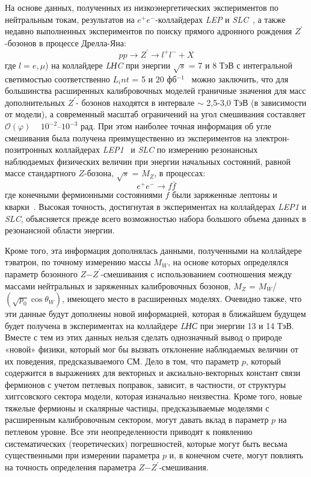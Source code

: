 На основе данных, полученных из низкоэнергетических экспериментов по нейтральным токам, результатов на $e^+e^-$-коллайдерах \textit{LEP} и \textit{SLC}~\cite{Bobovnikov:2016}, а также недавно выполненных экспериментов по поиску прямого адронного рождения $Z^\prime$-бозонов в процессе Дрелла-Яна:
\begin{equation} \label{eq:drell}
	pp \rightarrow Z^\prime \rightarrow l^+l^- + X
\end{equation}
где $l=e,\mu$) на коллайдере \textit{LНC} при энергии $\sqrt{s}$ = 7 и 8 ТэВ с интегральной светимостью соответственно $L_int$ = 5 и 20 фб${}^{-1}$~\cite{Bobovnikov:2016} можно заключить, что для большинства расширенных калибровочных моделей граничные значения для масс дополнительных $Z^\prime$- бозонов находятся в интервале $\sim$ 2,5-3,0 ТэВ (в зависимости от модели), а современный масштаб ограничений на угол смешивания составляет $\mathcal{O}(\varphi )$ ~ ${10}^{-2}$--${10}^{-3}$ рад. При этом наиболее точная информация об угле смешивания была получена преимущественно из экспериментов на электрон-позитронных коллайдерах \textit{LEP1}~\cite{schael:2006} и \textit{SLC} по измерению резонансных наблюдаемых физических величин при энергии начальных состояний, равной массе стандартного $Z$-бозона, $\sqrt{s}$ = $M_Z$, в процессах:
\begin{equation} \label{eq:drell2}
	e^+e^- \rightarrow f\bar{f}
\end{equation}
где конечными фермионными состояниями $f$ были заряженные лептоны и кварки~\cite{andreev-pankov:2012}. Высокая точность, достигнутая в экспериментах на коллайдерах \textit{LEP1} и \textit{SLC}, объясняется прежде всего возможностью набора большого объема данных в резонансной области энергии.

Кроме того, эта информация дополнялась данными, полученными на коллайдере тэватрон, по точному измерению массы $M_W$, на основе которых определялся параметр бозонного $Z$−$Z^\prime$-смешивания с использованием соотношения между массами нейтральных и заряженных калибровочных бозонов, $M_Z$ = $M_W$/$(\sqrt{p_0}\cos\theta_W)$, имеющего место в расширенных моделях. Очевидно также, что эти данные будут дополнены новой информацией, которая в ближайшем будущем будет получена в экспериментах на коллайдере \textit{LНС} при энергии 13 и 14 ТэВ. Вместе с тем из этих данных нельзя сделать однозначный вывод о природе «новой» физики, который мог бы вызвать отклонение наблюдаемых величин от их поведения, предсказываемого СМ. Дело в том, что параметр $p$, который содержится в выражениях для векторных и аксиально-векторных констант связи фермионов с учетом петлевых поправок, зависит, в частности, от структуры хиггсовского сектора модели, которая изначально неизвестна. Кроме того, новые тяжелые фермионы и скалярные частицы, предсказываемые моделями с расширенным калибровочным сектором, могут давать вклад в параметр $p$ на петлевом уровне. Все эти неопределенности приводят к появлению систематических (теоретических) погрешностей, которые могут быть весьма существенными при измерении параметра $p$ и, в конечном счете, могут повлиять на точность определения параметра $Z$−$Z^\prime$-смешивания.

